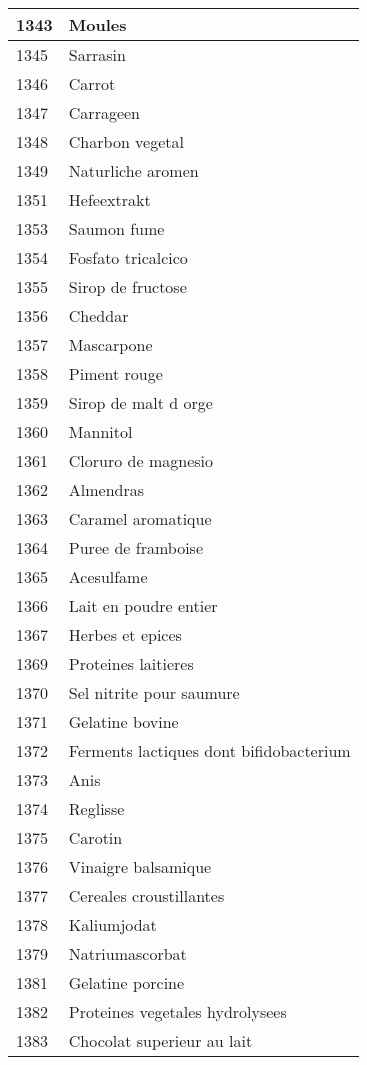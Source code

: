 \begin{longtable}{|l|l|}
1343 & Moules \\ \hline 
1345 & Sarrasin \\ \hline 
1346 & Carrot \\ \hline 
1347 & Carrageen \\ \hline 
1348 & Charbon vegetal \\ \hline 
1349 & Naturliche aromen \\ \hline 
1351 & Hefeextrakt \\ \hline 
1353 & Saumon fume \\ \hline 
1354 & Fosfato tricalcico \\ \hline 
1355 & Sirop de fructose \\ \hline 
1356 & Cheddar \\ \hline 
1357 & Mascarpone \\ \hline 
1358 & Piment rouge \\ \hline 
1359 & Sirop de malt d orge \\ \hline 
1360 & Mannitol \\ \hline 
1361 & Cloruro de magnesio \\ \hline 
1362 & Almendras \\ \hline 
1363 & Caramel aromatique \\ \hline 
1364 & Puree de framboise \\ \hline 
1365 & Acesulfame \\ \hline 
1366 & Lait en poudre entier \\ \hline 
1367 & Herbes et epices \\ \hline 
1369 & Proteines laitieres \\ \hline 
1370 & Sel nitrite pour saumure \\ \hline 
1371 & Gelatine bovine \\ \hline 
1372 & Ferments lactiques dont bifidobacterium \\ \hline 
1373 & Anis \\ \hline 
1374 & Reglisse \\ \hline 
1375 & Carotin \\ \hline 
1376 & Vinaigre balsamique \\ \hline 
1377 & Cereales croustillantes \\ \hline 
1378 & Kaliumjodat \\ \hline 
1379 & Natriumascorbat \\ \hline 
1381 & Gelatine porcine \\ \hline 
1382 & Proteines vegetales hydrolysees \\ \hline 
1383 & Chocolat superieur au lait \\ \hline 

\end{longtable}
